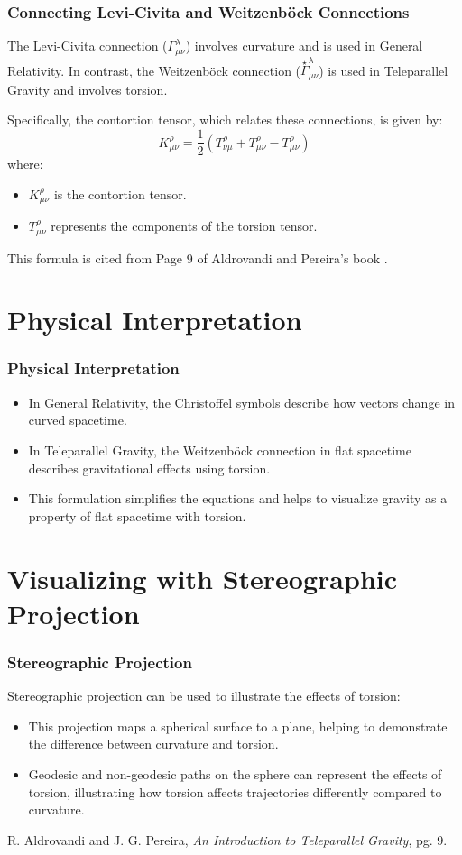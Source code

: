 \documentclass{beamer}
\begin{document}
\begin{frame}
  \frametitle{Connecting Levi-Civita and Weitzenböck Connections}
  The Levi-Civita connection ($\Gamma^\lambda_{\mu \nu}$) involves curvature and is used in General Relativity. In contrast, the Weitzenböck connection ($\overset{\star}{\Gamma}^\lambda_{\mu \nu}$) is used in Teleparallel Gravity and involves torsion.

  Specifically, the contortion tensor, which relates these connections, is given by:
  \[
  K^\rho_{\mu \nu} = \frac{1}{2} \left( T^\rho_{\nu \mu} + T^\rho_{\mu \nu} - T_{\mu \nu}^\rho \right)
  \]
  where:
  \begin{itemize}
    \item $K^\rho_{\mu \nu}$ is the contortion tensor.
    \item $T^\rho_{\mu \nu}$ represents the components of the torsion tensor.
  \end{itemize}
  This formula is cited from Page 9 of Aldrovandi and Pereira’s book \cite{AldrovandiPereira}.
\end{frame}

\section{Physical Interpretation}
\begin{frame}
  \frametitle{Physical Interpretation}
  \begin{itemize}
    \item In General Relativity, the Christoffel symbols describe how vectors change in curved spacetime.
    \item In Teleparallel Gravity, the Weitzenböck connection in flat spacetime describes gravitational effects using torsion.
    \item This formulation simplifies the equations and helps to visualize gravity as a property of flat spacetime with torsion.
  \end{itemize}
\end{frame}

\section{Visualizing with Stereographic Projection}
\begin{frame}
  \frametitle{Stereographic Projection}
  Stereographic projection can be used to illustrate the effects of torsion:
  \begin{itemize}
    \item This projection maps a spherical surface to a plane, helping to demonstrate the difference between curvature and torsion.
    \item Geodesic and non-geodesic paths on the sphere can represent the effects of torsion, illustrating how torsion affects trajectories differently compared to curvature.
  \end{itemize}
\end{frame}

\begin{thebibliography}{10}
    R. Aldrovandi and J. G. Pereira, \textit{An Introduction to Teleparallel Gravity}, pg. 9.
\end{thebibliography}
\end{document}
